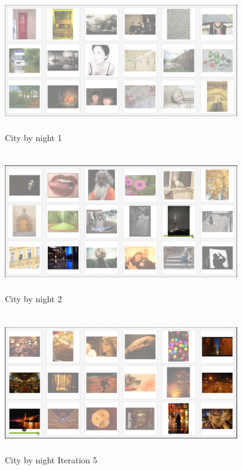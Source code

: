 \documentclass[english]{tktltiki}
\begin{document}
\begin{figure}[!h]
  \centering
    \includegraphics[width=0.90\textwidth,height=6cm]{figures/City_Night_1.png}
    \caption{City by night 1}
    \label{city_night_1}
\end{figure}

\begin{figure}[h!]
  \centering
    \includegraphics[width=0.90\textwidth,height=6cm]{figures/City_Night_2.png}
    \caption{City by night 2}
    \label{city_night_2}
\end{figure}

\begin{figure}[h!]
  \centering
    \includegraphics[width=0.90\textwidth,height=6cm]{figures/City_Night_5.png}
    \caption{City by night Iteration 5}
    \label{city_night_5}
\end{figure}
\end{document}
